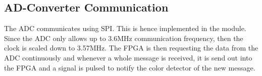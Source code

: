 
\subsection{AD-Converter Communication}
The ADC communicates using SPI.
This is hence implemented in the module.
Since the ADC only allows up to 3.6MHz communication frequency, then the clock is scaled down to 3.57MHz.
The FPGA is then requesting the data from the ADC continuously and whenever a whole message is received, it is send out into the FPGA and a signal is pulsed to notify the color detector of the new message.